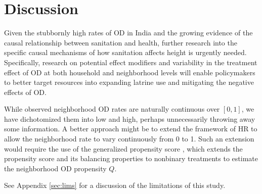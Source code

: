 \documentclass[12pt,a4paper,titlepage]{article}
\begin{document}
\section{Discussion}
Given the stubbornly high rates of OD in India and the growing evidence of the causal relationship between sanitation and health, further research into the specific causal mechanisms of how sanitation affects height is urgently needed. Specifically, research on potential effect modifiers and variability in the treatment effect of OD at both household and neighborhood levels will enable policymakers to better target resources into expanding latrine use and mitigating the negative effects of OD.

While observed neighborhood OD rates are naturally continuous over $[0,1]$, we have dichotomized them into low and high, perhaps unnecessarily throwing away some information. A better approach might be to extend the framework of HR to allow the neighborhood rate to vary continuously from 0 to 1. Such an extension would require the use of the generalized propensity score \citep{hirano_imbens}, which extends the propensity score and its balancing properties to nonbinary treatments to estimate the neighborhood OD propensity $Q$.

See Appendix \ref{sec:lims} for a discussion of the limitations of this study.




\end{document}
